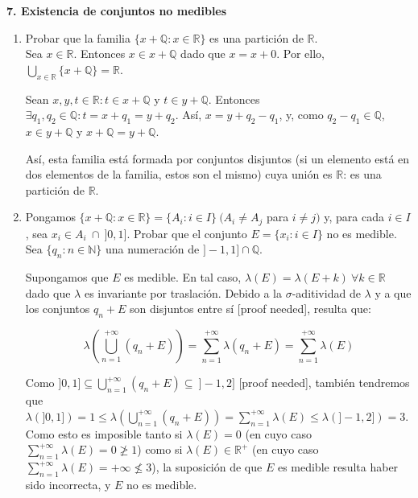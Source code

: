 
\textbf{7. Existencia de conjuntos no medibles}

\begin{enumerate}[label=\alph*)]
	\item Probar que la familia $\{x + \mathbb Q : x \in \mathbb R \}$ es una partición de $\mathbb R$. \\
	
	Sea $x \in \mathbb R$. Entonces $x \in x+\mathbb Q$ dado que $x = x + 0$. Por ello, $\displaystyle \bigcup_{x \in \mathbb R} \{x+\mathbb Q\} = \mathbb R$.
	
	Sean $x,y,t \in \mathbb R : t \in x+\mathbb Q$ y $t \in y + \mathbb Q$. Entonces $\exists q_1, q_2 \in \mathbb Q : t = x + q_1 = y + q_2$. Así, $x = y + q_2 - q_1$, y, como $q_2 - q_1 \in \mathbb Q$, $x \in y + \mathbb Q$ y $x + \mathbb Q = y + \mathbb Q$.
	
	Así, esta familia está formada por conjuntos disjuntos (si un elemento está en dos elementos de la familia, estos son el mismo) cuya unión es $\mathbb R$: es una partición de $\mathbb R$.
	
	\item Pongamos $\{x+\mathbb Q : x \in \mathbb R\} = \{A_i : i \in I\} \ (A_i \ne A_j$ para $i \ne j)$ y, para cada $i \in I$, sea $x_i \in A_i \ \cap \ ]0, 1]$. Probar que el conjunto $E = \{x_i : i \in I\}$ no es medible. \\
	
	Sea $\{q_n : n \in \mathbb N\}$ una numeración de $]-1, 1] \cap \mathbb Q$.
	
	Supongamos que $E$ es medible. En tal caso, $\lambda(E) = \lambda(E+k) \ \forall k \in \mathbb R$ dado que $\lambda$ es invariante por traslación. Debido a la $\sigma$-aditividad de $\lambda$ y a que los conjuntos $q_n + E$ son disjuntos entre sí [proof needed], resulta que:
	
	$$\lambda(\bigcup_{n = 1}^{+\infty} (q_n + E)) = \sum_{n=1}^{+\infty}\lambda(q_n + E) = \sum_{n=1}^{+\infty} \lambda(E)$$
	
	Como $\displaystyle ]0, 1] \subseteq \bigcup_{n=1}^{+\infty} (q_n + E) \subseteq \ ]-1, 2]$ [proof needed], también tendremos que $\displaystyle \lambda(]0, 1]) = 1 \le \lambda(\bigcup_{n=1}^{+\infty} (q_n + E)) = \sum_{n=1}^{+\infty} \lambda(E) \le \lambda(]-1, 2]) = 3$. Como esto es imposible tanto si $\lambda(E) = 0$ (en cuyo caso $\displaystyle \sum_{n=1}^{+\infty} \lambda(E) = 0 \ngeq 1$) como si $\lambda(E) \in \mathbb R^+$ (en cuyo caso $\displaystyle \sum_{n=1}^{+\infty} \lambda(E) = +\infty \nleq 3$), la suposición de que $E$ es medible resulta haber sido incorrecta, y $E$ no es medible.
	

\end{enumerate}

